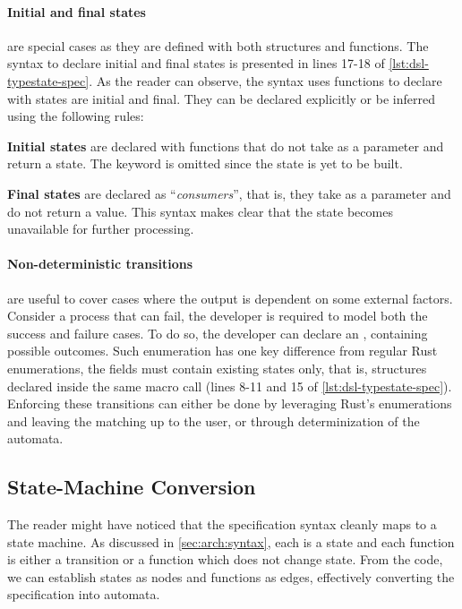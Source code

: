 \paragraph{Initial and final states} are special cases as they are defined with both structures and functions.
The syntax to declare initial and final states is presented in lines 17-18 of \autoref{lst:dsl-typestate-spec}.
As the reader can observe, the syntax uses functions to declare with states are initial and final.
They can be declared explicitly or be inferred using the following rules:
\begin{compactitem}
    \item \textbf{Initial states} are declared with functions that do not take  as a parameter and return a state.
    The  keyword is omitted since the state is yet to be built.
    \item \textbf{Final states} are declared as “\emph{consumers}”, that is, they take  as a parameter and do not return a value.
    This syntax makes clear that the state becomes unavailable for further processing.
\end{compactitem}

\paragraph{Non-deterministic transitions} are useful to cover cases where the output is dependent on some external factors.
Consider a process that can fail, the developer is required to model both the success and failure cases.
To do so, the developer can declare an , containing possible outcomes.
Such enumeration has one key difference from regular Rust enumerations, the fields must contain existing states only,
that is, structures declared inside the same macro call (lines 8-11 and 15 of \autoref{lst:dsl-typestate-spec}).
Enforcing these transitions can either be done by leveraging Rust's enumerations and leaving the matching up to the user,
or through determinization of the automata.






\subsection{State-Machine Conversion}
The reader might have noticed that the specification syntax cleanly maps to a state machine.
As discussed in \autoref{sec:arch:syntax}, each  is a state and each function is either a transition or a function which does not change state.
From the code, we can establish states as nodes and functions as edges,
effectively converting the specification into automata.

